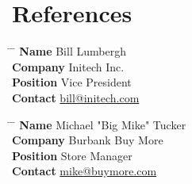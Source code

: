 \documentclass[10pt]{article} %
\newcommand{\reference}[4]{
\begin{tabbing}
\hspace{2cm} \= \hspace{4cm} \= \kill
\textbf{Name} \> #1\\
\textbf{Company} \> #2\\
\textbf{Position} \> #3\\
\textbf{Contact} \> \href{mailto:{#4}}{#4}
\end{tabbing}
}
\begin{document}
\section{References}

\parbox{0.5\textwidth}{
\reference
{Bill Lumbergh}
{Initech Inc.}
{Vice President}
{bill@initech.com}
}
%
\hfill
%
\parbox{0.5\textwidth}{
\reference
{Michael "Big Mike" Tucker}
{Burbank Buy More}
{Store Manager}
{mike@buymore.com}
}

\end{document}
